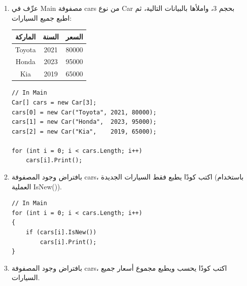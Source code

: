 \documentclass[14pt]{extarticle}
\begin{document}
\begin{enumerate}

\clearpage
\item
عرِّف في \textenglish{Main} مصفوفة \textenglish{cars} من نوع \textenglish{Car} بحجم 3،
واملأها بالبيانات التالية، ثم اطبع جميع السيارات:

\begin{center}
\begin{tabular}{|c|c|c|}
\hline
\textbf{الماركة} & \textbf{السنة} & \textbf{السعر} \\
\hline
\textenglish{Toyota} & \textenglish{2021} & \textenglish{80000} \\
\textenglish{Honda}  & \textenglish{2023} & \textenglish{95000} \\
\textenglish{Kia}    & \textenglish{2019} & \textenglish{65000} \\
\hline
\end{tabular}
\end{center}

\ifwithsols
\begin{boxSolution}
\begin{english}
{\small
\begin{verbatim}
// In Main
Car[] cars = new Car[3];
cars[0] = new Car("Toyota", 2021, 80000);
cars[1] = new Car("Honda",  2023, 95000);
cars[2] = new Car("Kia",    2019, 65000);

for (int i = 0; i < cars.Length; i++)
    cars[i].Print();
\end{verbatim}
}
\end{english}
\end{boxSolution}
\clearpage
\fi

\item
بافتراض وجود المصفوفة \textenglish{cars}، اكتب كودًا يطبع فقط السيارات الجديدة
(باستخدام العملية \textenglish{IsNew()}).

\ifwithsols
\begin{boxSolution}
\begin{english}
{\small
\begin{verbatim}
// In Main
for (int i = 0; i < cars.Length; i++)
{
    if (cars[i].IsNew())
        cars[i].Print();
}
\end{verbatim}
}
\end{english}
\end{boxSolution}
\clearpage
\fi

\item
بافتراض وجود المصفوفة \textenglish{cars}، اكتب كودًا يحسب ويطبع مجموع أسعار
جميع السيارات.


\end{enumerate}
\end{document}
